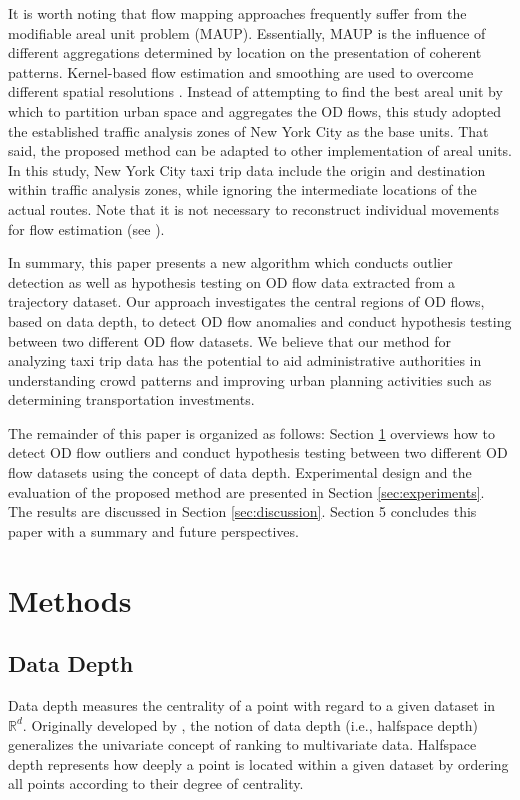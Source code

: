 \documentclass[a4paper,UKenglish]{lipics-v2018}
\begin{document}
It is worth noting that flow mapping approaches frequently suffer from the modifiable areal unit problem (MAUP). 
Essentially, MAUP is the influence of different aggregations determined by location on the presentation of coherent patterns.
Kernel-based flow estimation and smoothing are used to overcome different spatial resolutions \cite{guo14IEEETVCG}. 
Instead of attempting to find the best areal unit by which to partition urban space and aggregates the OD flows, this study adopted the established traffic analysis zones of New York City as the base units.
That said, the proposed method can be adapted to other implementation of areal units.
In this study, New York City taxi trip data include the origin and destination within traffic analysis zones, while ignoring the intermediate locations of the actual routes.
Note that it is not necessary to reconstruct individual movements for flow estimation (see \cite{duckham16ICGIS}).

In summary, this paper presents a new algorithm which conducts outlier detection as well as hypothesis testing on OD flow data extracted from a trajectory dataset.
Our approach investigates the central regions of OD flows, based on data depth, to detect OD flow anomalies and conduct hypothesis testing between two different OD flow datasets.
We believe that our method for analyzing taxi trip data has the potential to aid administrative authorities in understanding crowd patterns and improving urban planning activities such as determining transportation investments. 

The remainder of this paper is organized as follows: Section \ref{sec:methods} overviews how to detect OD flow outliers and conduct hypothesis testing between two different OD flow datasets using the concept of data depth. 
Experimental design and the evaluation of the proposed method are presented in Section \ref{sec:experiments}. 
The results are discussed in Section \ref{sec:discussion}. 
Section 5 concludes this paper with a summary and future perspectives.


\section{Methods}
\label{sec:methods}

\subsection{Data Depth}
Data depth measures the centrality of a point with regard to a given dataset in $\mathbb{R}^d$.
Originally developed by \cite{tukey75ICM}, the notion of data depth (i.e., halfspace depth) generalizes the univariate concept of ranking to multivariate data.
Halfspace depth represents how deeply a point is located within a given dataset by ordering all points according to their degree of centrality. 
\end{document}
